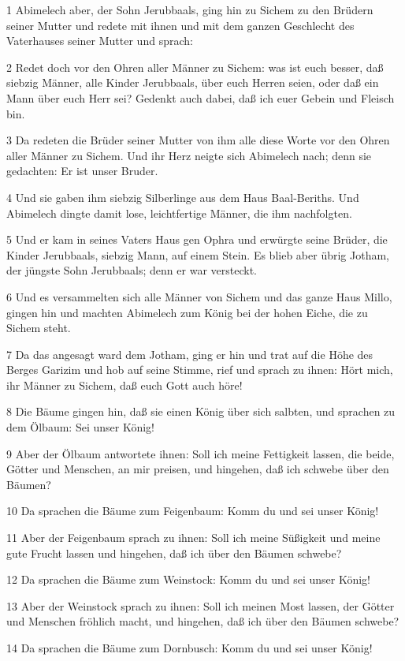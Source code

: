 \par 1 Abimelech aber, der Sohn Jerubbaals, ging hin zu Sichem zu den Brüdern seiner Mutter und redete mit ihnen und mit dem ganzen Geschlecht des Vaterhauses seiner Mutter und sprach:
\par 2 Redet doch vor den Ohren aller Männer zu Sichem: was ist euch besser, daß siebzig Männer, alle Kinder Jerubbaals, über euch Herren seien, oder daß ein Mann über euch Herr sei? Gedenkt auch dabei, daß ich euer Gebein und Fleisch bin.
\par 3 Da redeten die Brüder seiner Mutter von ihm alle diese Worte vor den Ohren aller Männer zu Sichem. Und ihr Herz neigte sich Abimelech nach; denn sie gedachten: Er ist unser Bruder.
\par 4 Und sie gaben ihm siebzig Silberlinge aus dem Haus Baal-Beriths. Und Abimelech dingte damit lose, leichtfertige Männer, die ihm nachfolgten.
\par 5 Und er kam in seines Vaters Haus gen Ophra und erwürgte seine Brüder, die Kinder Jerubbaals, siebzig Mann, auf einem Stein. Es blieb aber übrig Jotham, der jüngste Sohn Jerubbaals; denn er war versteckt.
\par 6 Und es versammelten sich alle Männer von Sichem und das ganze Haus Millo, gingen hin und machten Abimelech zum König bei der hohen Eiche, die zu Sichem steht.
\par 7 Da das angesagt ward dem Jotham, ging er hin und trat auf die Höhe des Berges Garizim und hob auf seine Stimme, rief und sprach zu ihnen: Hört mich, ihr Männer zu Sichem, daß euch Gott auch höre!
\par 8 Die Bäume gingen hin, daß sie einen König über sich salbten, und sprachen zu dem Ölbaum: Sei unser König!
\par 9 Aber der Ölbaum antwortete ihnen: Soll ich meine Fettigkeit lassen, die beide, Götter und Menschen, an mir preisen, und hingehen, daß ich schwebe über den Bäumen?
\par 10 Da sprachen die Bäume zum Feigenbaum: Komm du und sei unser König!
\par 11 Aber der Feigenbaum sprach zu ihnen: Soll ich meine Süßigkeit und meine gute Frucht lassen und hingehen, daß ich über den Bäumen schwebe?
\par 12 Da sprachen die Bäume zum Weinstock: Komm du und sei unser König!
\par 13 Aber der Weinstock sprach zu ihnen: Soll ich meinen Most lassen, der Götter und Menschen fröhlich macht, und hingehen, daß ich über den Bäumen schwebe?
\par 14 Da sprachen die Bäume zum Dornbusch: Komm du und sei unser König!
